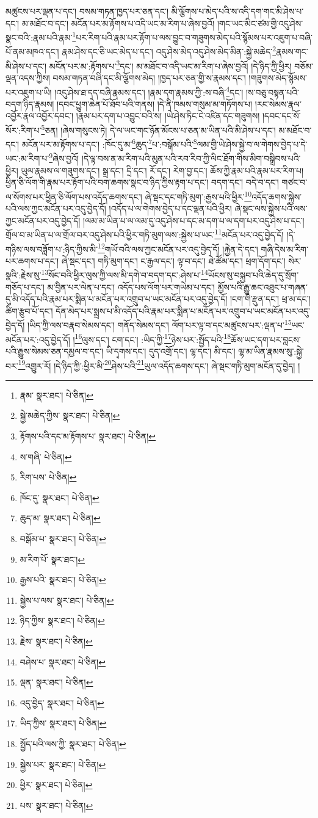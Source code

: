 མཚུངས་པར་ལྡན་པ་དང་། བསམ་གཏན་ཁྱད་པར་ཅན་དང་། མི་ལྕོགས་པ་མེད་པའི་ས་འདི་དག་གང་མི་ཤེས་པ་དང་། མ་མཐོང་བ་དང་། མངོན་པར་མ་རྟོགས་པ་འདི་ཡང་མ་རིག་པ་ཞེས་བྱའོ། །གང་ཡང་མིང་ཙམ་གྱི་འདུ་ཤེས་སྣང་བའི་:རྣམ་པའི་རྣམ་\footnote{རྣམ་  སྣར་ཐང་།  པེ་ཅིན། }པར་རིག་པའི་རྣམ་པར་རྟོག་པ་ལས་བྱུང་བ་གཟུགས་མེད་པའི་སྙོམས་པར་འཇུག་པ་བཞི་པོ་ནམ་མཁའ་དང་། རྣམ་ཤེས་དང་ཅི་ཡང་མེད་པ་དང་། འདུ་ཤེས་མེད་འདུ་ཤེས་མེད་མིན་:སྐྱེ་མཆེད་\footnote{སྐྱེ་མཆེད་ཀྱིས་  སྣར་ཐང་།  པེ་ཅིན། }རྣམས་གང་མི་ཤེས་པ་དང་། མངོན་པར་མ་:རྟོགས་པ་\footnote{རྟོགས་པའི་དང་མ་རྟོགས་པ་  སྣར་ཐང་།  པེ་ཅིན། }དང་། མ་མཐོང་བ་འདི་ཡང་མ་རིག་པ་ཞེས་བྱའོ། །དེ་ཉིད་ཀྱི་ཕྱིར། བཅོམ་ལྡན་འདས་ཀྱིས། བསམ་གཏན་བཞི་དང་མི་ལྕོགས་མེད། །ཁྱད་པར་ཅན་གྱི་ས་རྣམས་དང་། །གཟུགས་མེད་སྙོམས་པར་འཇུག་པ་ཡི། །འདུ་ཤེས་ཐ་དད་བཞི་རྣམས་དང་། །རྣམ་དག་རྣམས་ཀྱི་:ས་བཞི་\footnote{ས་གཞི་  པེ་ཅིན། }དང་། །ས་བཅུ་བསྟན་པའི་བདག་ཉིད་རྣམས། །དབང་ཕྱུག་ཆེན་པོ་ཐོབ་པའི་གནས། །དེ་ནི་ཁམས་གསུམ་མ་གཏོགས་པ། །རང་སེམས་རྣལ་འབྱོར་རྣལ་འབྱོར་དབང་། །རྣམ་པར་དག་པ་འབྱུང་བའི་ས། །ཡེ་ཤེས་ཏིང་ངེ་འཛིན་དང་གཟུགས། །དབང་དང་སོ་སོར་:རིག་པ་\footnote{རིག་པས་  པེ་ཅིན། }ཅན། །ཞེས་གསུངས་ཏེ། དེ་ལ་ཡང་གང་ཉོན་མོངས་པ་ཅན་མ་ཡིན་པའི་མི་ཤེས་པ་དང་། མ་མཐོང་བ་དང་། མངོན་པར་མ་རྟོགས་པ་དང་། :ཁོང་དུ་མ་\footnote{ཁོང་དུ་  སྣར་ཐང་།  པེ་ཅིན། }ཆུད་\footnote{ཆུད་མ་  སྣར་ཐང་།  པེ་ཅིན། }པ་:བསྒོམ་པའི་\footnote{བསྒོམ་པ་  སྣར་ཐང་།  པེ་ཅིན། }ལམ་གྱི་ཡེ་ཤེས་སྐྱེ་བ་ལ་གེགས་བྱེད་པ་དེ་ཡང་:མ་རིག་པ་\footnote{མ་རིག་པོ་  སྣར་ཐང་། }ཞེས་བྱའོ། །དེ་ལྟ་བས་ན་མ་རིག་པའི་མུན་པའི་རབ་རིབ་ཀྱི་ལིང་ཐོག་གིས་མིག་བསྒྲིབས་པའི་ཕྱིར། ཡུལ་རྣམས་ལ་གཟུགས་དང་། སྒྲ་དང་། དྲི་དང་། རོ་དང་། རེག་བྱ་དང་། ཆོས་ཀྱི་རྣམ་པའི་རྣམ་པར་རིག་པ། ཕྱིན་ཅི་ལོག་གི་རྣམ་པར་རྟོག་པའི་བག་ཆགས་སྣང་བ་ཉིད་ཀྱིས་རྟག་པ་དང་། བདག་དང་། བདེ་བ་དང་། གཙང་བ་ལ་སོགས་པར་ཕྱིན་ཅི་ལོག་པས་འདོད་ཆགས་དང་། ཞེ་སྡང་དང་གཏི་མུག་:རྒྱས་པའི་ཕྱིར་\footnote{རྒྱས་པའི་  སྣར་ཐང་།  པེ་ཅིན། }འདོད་ཆགས་སྐྱེས་པའི་ལས་ཀྱང་མངོན་པར་འདུ་བྱེད་དོ། །འདོད་པ་ལ་གེགས་བྱེད་པ་དང་ལྡན་པའི་ཕྱིར། ཞེ་སྡང་ལས་སྐྱེས་པའི་ལས་ཀྱང་མངོན་པར་འདུ་བྱེད་དོ། །ལམ་མ་ཡིན་པ་ལ་ལམ་དུ་འདུ་ཤེས་པ་དང་མ་དག་པ་ལ་དག་པར་འདུ་ཤེས་པ་དང་། གྲོལ་བ་མ་ཡིན་པ་ལ་གྲོལ་བར་འདུ་ཤེས་པའི་ཕྱིར་གཏི་མུག་ལས་:སྐྱེས་པ་ཡང་\footnote{སྐྱེས་པ་ལས་  སྣར་ཐང་།  པེ་ཅིན། }མངོན་པར་འདུ་བྱེད་དོ། །དེ་གཉིས་ལས་བཟློག་པ་:ཉིད་ཀྱིས་མི་\footnote{ཉིད་ཀྱིས་  སྣར་ཐང་།  པེ་ཅིན། }གཡོ་བའི་ལས་ཀྱང་མངོན་པར་འདུ་བྱེད་དོ། །རྐྱེན་དེ་དང་། གཞི་དེས་མ་རིག་པར་ཆགས་པ་དང་། ཞེ་སྡང་དང་། གཏི་མུག་དང་། ང་རྒྱལ་དང་། ལྟ་བ་དང་། ཐེ་ཚོམ་དང་། ཕྲག་དོག་དང་། སེར་སྣའི་:རྗེས་སུ་\footnote{རྗེས་  སྣར་ཐང་།  པེ་ཅིན། }སོང་བའི་ཕྱིར་ལུས་ཀྱི་ལས་མི་དགེ་བ་བདག་དང་:ཤེས་པ་\footnote{བཤེས་པ་  སྣར་ཐང་།  པེ་ཅིན། }ཡོངས་སུ་བསྐྱབ་པའི་ཆེད་དུ་སྲོག་གཅོད་པ་དང་། མ་བྱིན་པར་ལེན་པ་དང་། འདོད་པས་ལོག་པར་གཡེམ་པ་དང་། མྱོས་པའི་རྒྱུ་ཆང་འཐུང་པ་གཞན་དུ་མི་འདོད་པའི་རྣམ་པར་སྨིན་པ་མངོན་པར་འགྲུབ་པ་ཡང་མངོན་པར་འདུ་བྱེད་དོ། །ངག་གི་རྫུན་དང་། ཕྲ་མ་དང་། ཚིག་རྩུབ་པོ་དང་། དོན་མེད་པར་སྨྲས་པ་མི་འདོད་པའི་རྣམ་པར་སྨིན་པ་མངོན་པར་འགྲུབ་པ་ཡང་མངོན་པར་འདུ་བྱེད་དོ། །ཡིད་ཀྱི་ལས་བརྣབ་སེམས་དང་། གནོད་སེམས་དང་། ལོག་པར་ལྟ་བ་དང་མཚུངས་པར་:ལྡན་པ་\footnote{ལྡན་  སྣར་ཐང་།  པེ་ཅིན། }ཡང་མངོན་པར་:འདུ་བྱེད་དོ། །\footnote{འདུ་བྱེད་  སྣར་ཐང་།  པེ་ཅིན། }ལུས་དང་། ངག་དང་། :ཡིད་ཀྱི་\footnote{ཡིད་ཀྱིས་  སྣར་ཐང་།  པེ་ཅིན། }ཉེས་པར་:སྤྱོད་པའི་\footnote{སྤྱོད་པའི་ལས་ཀྱི་  སྣར་ཐང་།  པེ་ཅིན། }ཆོས་ཡང་དག་པར་བླངས་པའི་རྒྱུས་སེམས་ཅན་དམྱལ་བ་དང་། ཡི་དྭགས་དང་། དུད་འགྲོ་དང་། ལྷ་དང་། མི་དང་། ལྷ་མ་ཡིན་རྣམས་སུ་:སྐྱེ་བར་\footnote{སྐྱེས་པར་  སྣར་ཐང་།  པེ་ཅིན། }འགྱུར་རོ། །དེ་ཉིད་ཀྱི་:ཕྱིར་མི་\footnote{ཕྱིར་  སྣར་ཐང་།  པེ་ཅིན། }ཤེས་པའི་\footnote{པས་  སྣར་ཐང་།  པེ་ཅིན། }ཡུལ་འདོད་ཆགས་དང་། ཞེ་སྡང་གཏི་མུག་མངོན་དུ་བྱེད། །
